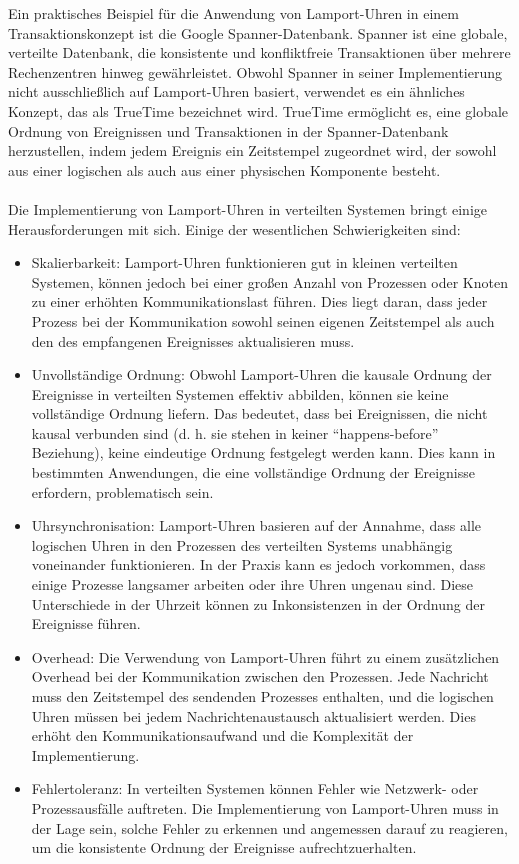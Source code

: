 \documentclass[../vs-script-first-v01.tex]{subfiles}
\begin{document}
Ein praktisches Beispiel für die Anwendung von Lamport-Uhren in einem Transaktionskonzept ist die Google Spanner-Datenbank. Spanner ist eine globale, verteilte Datenbank, die konsistente und konfliktfreie Transaktionen über mehrere Rechenzentren hinweg gewährleistet. Obwohl Spanner in seiner Implementierung nicht ausschließlich auf Lamport-Uhren basiert, verwendet es ein ähnliches Konzept, das als TrueTime bezeichnet wird. TrueTime ermöglicht es, eine globale Ordnung von Ereignissen und Transaktionen in der Spanner-Datenbank herzustellen, indem jedem Ereignis ein Zeitstempel zugeordnet wird, der sowohl aus einer logischen als auch aus einer physischen Komponente besteht.
\\\\
Die Implementierung von Lamport-Uhren in verteilten Systemen bringt einige Herausforderungen mit sich. Einige der wesentlichen Schwierigkeiten sind:
\begin{itemize}
\item Skalierbarkeit: Lamport-Uhren funktionieren gut in kleinen verteilten Systemen, können jedoch bei einer großen Anzahl von Prozessen oder Knoten zu einer erhöhten Kommunikationslast führen. Dies liegt daran, dass jeder Prozess bei der Kommunikation sowohl seinen eigenen Zeitstempel als auch den des empfangenen Ereignisses aktualisieren muss.
\item Unvollständige Ordnung: Obwohl Lamport-Uhren die kausale Ordnung der Ereignisse in verteilten Systemen effektiv abbilden, können sie keine vollständige Ordnung liefern. Das bedeutet, dass bei Ereignissen, die nicht kausal verbunden sind (d. h. sie stehen in keiner \enquote{happens-before} Beziehung), keine eindeutige Ordnung festgelegt werden kann. Dies kann in bestimmten Anwendungen, die eine vollständige Ordnung der Ereignisse erfordern, problematisch sein.
\item Uhrsynchronisation: Lamport-Uhren basieren auf der Annahme, dass alle logischen Uhren in den Prozessen des verteilten Systems unabhängig voneinander funktionieren. In der Praxis kann es jedoch vorkommen, dass einige Prozesse langsamer arbeiten oder ihre Uhren ungenau sind. Diese Unterschiede in der Uhrzeit können zu Inkonsistenzen in der Ordnung der Ereignisse führen.
\item Overhead: Die Verwendung von Lamport-Uhren führt zu einem zusätzlichen Overhead bei der Kommunikation zwischen den Prozessen. Jede Nachricht muss den Zeitstempel des sendenden Prozesses enthalten, und die logischen Uhren müssen bei jedem Nachrichtenaustausch aktualisiert werden. Dies erhöht den Kommunikationsaufwand und die Komplexität der Implementierung.
\item Fehlertoleranz: In verteilten Systemen können Fehler wie Netzwerk- oder Prozessausfälle auftreten. Die Implementierung von Lamport-Uhren muss in der Lage sein, solche Fehler zu erkennen und angemessen darauf zu reagieren, um die konsistente Ordnung der Ereignisse aufrechtzuerhalten.
\end{itemize}
\end{document}
